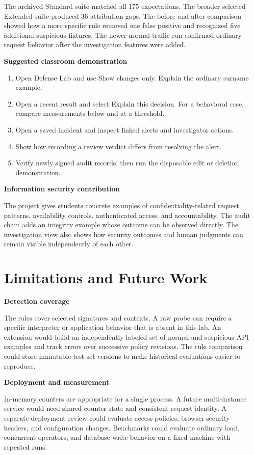 \documentclass[11pt,a4paper,oneside]{report}
\newcommand{\topic}[1]{\smallskip\noindent\textbf{#1}\par\nobreak\vspace{-.39em}}
\newcommand{\sheet}[1]{\clearpage\section{#1}}
\begin{document}
The archived Standard suite matched all 175 expectations. The broader selected Extended suite produced 36 attribution gaps. The before-and-after comparison showed how a more specific rule removed one false positive and recognized five additional suspicious fixtures. The newer normal-traffic run confirmed ordinary request behavior after the investigation features were added.

\topic{Suggested classroom demonstration}
\begin{enumerate}
\item Open Defense Lab and use Show changes only. Explain the ordinary surname example.
\item Open a recent result and select Explain this decision. For a behavioral case, compare measurements below and at a threshold.
\item Open a saved incident and inspect linked alerts and investigator actions.
\item Show how recording a review verdict differs from resolving the alert.
\item Verify newly signed audit records, then run the disposable edit or deletion demonstration.
\end{enumerate}

\topic{Information security contribution}
The project gives students concrete examples of confidentiality-related request patterns, availability controls, authenticated access, and accountability. The audit chain adds an integrity example whose outcome can be observed directly. The investigation view also shows how security outcomes and human judgments can remain visible independently of each other.

\sheet{Limitations and Future Work}
\topic{Detection coverage}
The rules cover selected signatures and contexts. A raw probe can require a specific interpreter or application behavior that is absent in this lab. An extension would build an independently labeled set of normal and suspicious API examples and track errors over successive policy revisions. The rule comparison could store immutable test-set versions to make historical evaluations easier to reproduce.

\topic{Deployment and measurement}
In-memory counters are appropriate for a single process. A future multi-instance service would need shared counter state and consistent request identity. A separate deployment review could evaluate access policies, browser security headers, and configuration changes. Benchmarks could evaluate ordinary load, concurrent operators, and database-write behavior on a fixed machine with repeated runs.
\end{document}
